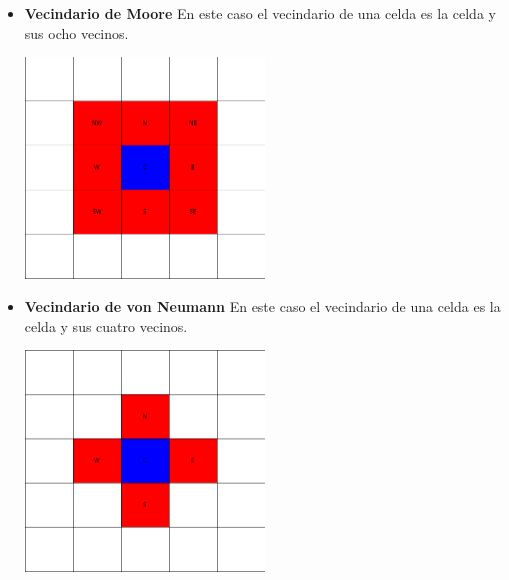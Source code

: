     \begin{itemize}
        \item 
            \begin{minipage}
                {0.5\textwidth}
                \textbf{Vecindario de Moore} En este caso el vecindario de una celda es la celda y sus ocho vecinos.
            \end{minipage}
            \begin{minipage}{0.5\textwidth}
                \centering
                \includegraphics[width=0.5\textwidth]{./images/marco_teorico/automatas_celulares/mooreN.png}
                \label{fig:mooreN}
            \end{minipage}
        \item
            \begin{minipage}
                {0.5\textwidth}
                \textbf{Vecindario de von Neumann} En este caso el vecindario de una celda es la celda y sus cuatro vecinos.
            \end{minipage}
            \begin{minipage}
                {0.5\textwidth}
                \centering
                \includegraphics[width=0.5\textwidth]{./images/marco_teorico/automatas_celulares/vonN.png}

\end{minipage}
\end{itemize}
